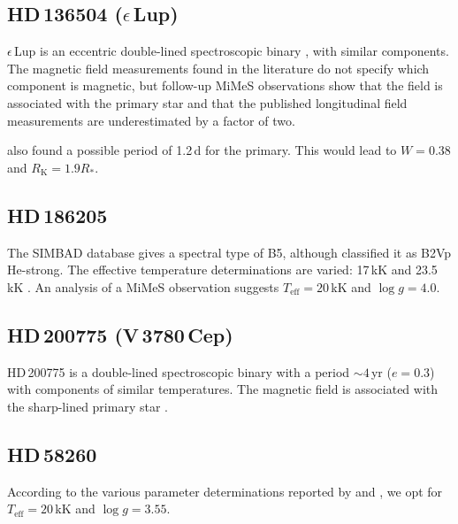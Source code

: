 \documentclass[useAMS,usenatbib]{mn2e}
\newcommand{\rk}{R_\mathrm{K}}
\newcommand{\rs}{R_\ast}
\newcommand{\teff}{T_\mathrm{eff}}
\begin{document}
\setcounter{subsection}{34}
\subsection{HD\,136504 ($\epsilon$\,Lup)}

$\epsilon$\,Lup is an eccentric double-lined spectroscopic binary \citep[$P=4.6$\,d, $e=0.28$;][]{2005A&A...440..249U}, with similar components. The magnetic field measurements found in the literature \citep{2009AN....330..317H,2012ApJ...750....2S} do not specify which component is magnetic, but follow-up MiMeS observations show that the field is associated with the primary star and that the published longitudinal field measurements are underestimated by a factor of two. 

\citet{2005A&A...440..249U} also found a possible period of 1.2\,d for the primary. This would lead to $W=0.38$ and $\rk=1.9\rs$.

\setcounter{subsection}{39}	
\subsection{HD\,186205}

The SIMBAD database gives a spectral type of B5, although \cite{1975PASP...87..613W} classified it as B2Vp He-strong. The effective temperature determinations are varied: 17\,kK \citep{2000CoSka..30...12Z} and 23.5\,kK \citep{1977A&A....60..259L}. An analysis of a MiMeS observation suggests $\teff=20$\,kK and $\log g=4.0$.

\setcounter{subsection}{41}
\subsection{HD\,200775 (V\,3780\,Cep)}

HD\,200775 is a double-lined spectroscopic binary with a period $\sim4$\,yr ($e=0.3$) with components of similar temperatures. The magnetic field is associated with the sharp-lined primary star \citep{2008MNRAS.385..391A}.
	
\setcounter{subsection}{47}
\subsection{HD\,58260}

According to the various parameter determinations reported by \citet{2007A&A...468..263C} and \citet{1989ApJ...346..459B}, we opt for $\teff=20$\,kK and $\log g=3.55$. 
\end{document}
